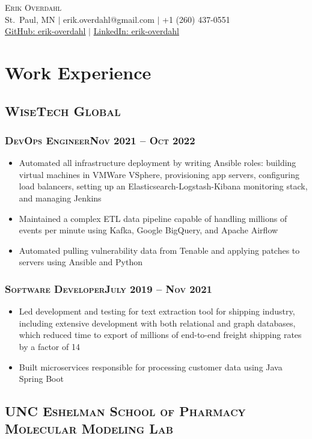 \documentclass{article}
\newcommand{\resumeSection}[1]{\section*{#1}}
\newcommand{\institution}[1]{\subsection*{\scshape{#1}}}
\newcommand{\jobPosition}[3]{\subsubsection*{\scshape{#1}\hfill #2 -- #3}}
\begin{document}
\begin{center}
  {\Huge\scshape{Erik Overdahl}}
  \\\vspace{3pt}
  \normalsize{
    St.\ Paul, MN
    $|$
    erik.overdahl@gmail.com
    $|$
    +1 (260) 437-0551
    \\
    \href{https://github.com/erik-overdahl}{GitHub: \underline{erik-overdahl}}
    $|$
    \href{https://linkedin.com/in/erik-overdahl}{LinkedIn: \underline{erik-overdahl}}
  }
\end{center}

\resumeSection{Work Experience}

  \institution{WiseTech Global}

    \jobPosition{DevOps Engineer}{Nov 2021}{Oct 2022}
    \begin{itemize}[noitemsep]
      \item
            Automated all infrastructure deployment by writing Ansible
            roles: building virtual machines in VMWare VSphere,
            provisioning app servers, configuring load balancers, setting
            up an Elasticsearch-Logstash-Kibana monitoring stack, and
            managing Jenkins
      \item
            Maintained a complex ETL data pipeline capable of handling
            millions of events per minute using Kafka, Google BigQuery,
            and Apache Airflow
      \item
            Automated pulling vulnerability data from Tenable and
            applying patches to servers using Ansible and Python
    \end{itemize}

    \jobPosition{Software Developer}{July 2019}{Nov 2021}
    \begin{itemize}[noitemsep]
      \item
            Led development and testing for text extraction tool for
            shipping industry, including extensive development with
            both relational and graph databases, which reduced time to
            export of millions of end-to-end freight shipping rates by
            a factor of 14
      \item
            Built microservices responsible for processing customer
            data using Java Spring Boot
    \end{itemize}

  \institution{UNC Eshelman School of Pharmacy Molecular Modeling Lab}
\end{document}
